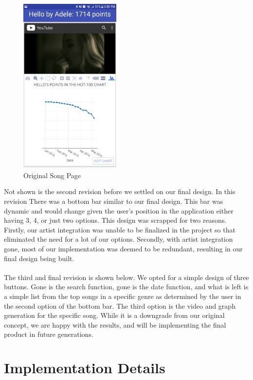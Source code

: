 \documentclass{article}
\newcommand\tab[1][1cm]{\hspace*{#1}}
\begin{document}
\begin{figure}[H]
  \begin{center}
    \includegraphics[width=0.45\textwidth]{original_song_graph.png}
    \caption{Original Song Page}
    \label{fig:ER}
  \end{center}
\end{figure}
Not shown is the second revision before we settled on our final design. In this revision There was a bottom bar similar to our final design. This bar was dynamic and would change given the user's position in the application either having 3, 4, or just two options. This design was scrapped for two reasons. Firstly, our artist integration was unable to be finalized in the project so that eliminated the need for a lot of our options. Secondly, with artist integration gone, most of our implementation was deemed to be redundant, resulting in our final design being built. 
\\ \\ \tab The third and final revision is shown below. We opted for a simple design of three buttons. Gone is the search function, gone is the date function, and what is left is a simple list from the top songs in a specific genre as determined by the user in the second option of the bottom bar. The third option is the video and graph generation for the specific song. While it is a downgrade from our original concept, we are happy with the results, and will be implementing the final product in future generations. 


\section*{Implementation Details}
\end{document}
